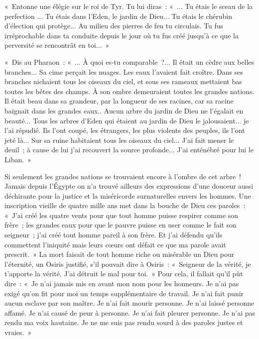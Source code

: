 \documentclass[french,twoside]{book} %
\begin{document}
« Entonne une élégie sur le roi de Tyr. Tu lui diras : « ... Tu étais le sceau de la perfection ... Tu étais dans l'Eden, le jardin de Dieu... Tu étais le chérubin d'élection qui protège... Au milieu des pierres de feu tu circulais. Tu fus irréprochable dans ta conduite depuis le jour où tu fus créé jusqu'à ce que la perversité se rencontrât en toi... »\par
« Dis au Pharaon : « ... À quoi es-tu comparable ?... Il était un cèdre aux belles branches... Sa cime perçait les nuages. Les eaux l'avaient fait croître. Dans ses branches nichaient tous les oiseaux du ciel, et sous ses rameaux mettaient bas toutes les bêtes des champs. À son ombre demeuraient toutes les grandes nations. Il était beau dans sa grandeur, par la longueur de ses racines, car sa racine baignait dans les grandes eaux.. Aucun arbre du jardin de Dieu ne l'égalait en beauté... Tous les arbres d'Eden qui étaient au jardin de Dieu le jalousaient... je l'ai répudié. Ils l'ont coupé, les étrangers, les plus violents des peuples, ils l'ont jeté là... Sur sa ruine habitaient tous les oiseaux du ciel... J'ai fait mener le deuil ; à cause de lui j'ai recouvert la source profonde... J'ai enténébré pour lui le Liban. »\par
Si seulement les grandes nations se trouvaient encore à l'ombre de cet arbre ! Jamais depuis l'Égypte on n'a trouvé ailleurs des expressions d'une douceur aussi déchirante pour la justice et la miséricorde surnaturelles envers les hommes. Une inscription vieille de quatre mille ans met dans la bouche de Dieu ces paroles : « J'ai créé les quatre vents pour que tout homme puisse respirer comme son frère ; les grandes eaux pour que le pauvre puisse en user comme le fait son seigneur ; j'ai créé tout homme pareil à son frère. Et j'ai défendu qu'ils commettent l'iniquité mais leurs cœurs ont défait ce que ma parole avait prescrit. » La mort faisait de tout homme riche ou misérable un Dieu pour l'éternité, un Osiris justifié, s'il pouvait dire à Osiris : « Seigneur de la vérité, je t'apporte la vérité. J'ai détruit le mal pour toi. » Pour cela, il fallait qu'il pût dire : « Je n'ai jamais mis en avant mon nom pour les honneurs. Je n'ai pas exigé qu'on fit pour moi un temps supplémentaire de travail. Je n'ai fait punir aucun esclave par son maître. Je n'ai fait mourir personne. Je n'ai laissé personne affamé. Je n'ai causé de peur à personne. Je n'ai fait pleurer personne. Je n'ai pas rendu ma voix hautaine. Je ne me suis pas rendu sourd à des paroles justes et vraies. »\par
\end{document}
